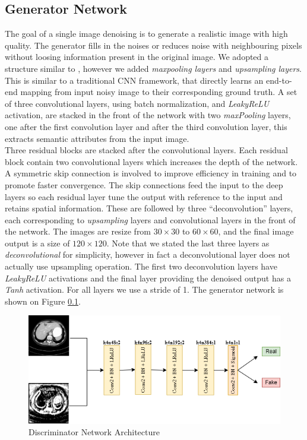 \documentclass[journal]{IEEEtran}
\begin{document}
\subsection{Generator Network}
\label{generator}
The goal of a single image denoising is to generate a realistic image with high quality.  The generator fills in the noises or reduces noise with neighbouring pixels without loosing information present in the original image.  We adopted a structure similar to \cite{alsaiari2019image}, however we added \emph{maxpooling layers} and \emph{upsampling layers}.  This is similar to a traditional CNN framework, that directly learns an end-to-end mapping from input noisy image to their corresponding ground truth.  A set of three convolutional layers, using batch normalization, and \emph{LeakyReLU} activation, are stacked in the front of the network with two \emph{maxPooling} layers, one after the first convolution layer and after the third convolution layer, this extracts semantic attributes from the input image.\\
	Three residual blocks are stacked after the convolutional layers.  Each residual block contain two convolutional layers which increases the depth of the network.  A symmetric skip connection is involved to improve efficiency in training and to promote faster convergence.  The skip connections feed the input to the deep layers so each residual layer tune the output with reference to the input and retains spatial information.  These are followed by three ``deconvolution'' layers, each corresponding to \emph{upsampling} layers and convolutional layers in the front of the network.   The images are resize from $30 \times 30$ to $60 \times 60$, and the final image output is a size of $120 \times 120$.  Note that we stated the last three layers as \emph{deconvolutional} for simplicity, however in fact a deconvolutional layer does not actually use upsampling operation.  The first two deconvolution layers have \emph{LeakyReLU} activations and the final layer providing the denoised output has a \emph{Tanh} activation.  For all layers we use a stride of 1.  The generator network is shown on Figure \ref{generator}.

\begin{figure}[b]
    \centering
    \includegraphics[width=12cm]{discriminator}
    \caption{Discriminator Network Architecture}
    \label{discriminator}
\end{figure}
\end{document}
